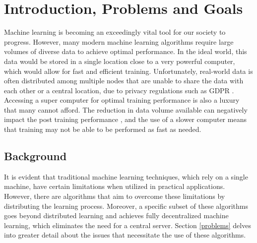 \chapter{Introduction, Problems and Goals}
Machine learning is becoming an exceedingly vital tool for our society to progress. However, many modern machine learning algorithms require large volumes of diverse data to achieve optimal performance. In the ideal world, this data would be stored in a single location close to a very powerful computer, which would allow for fast and efficient training. Unfortunately, real-world data is often distributed among multiple nodes that are unable to share the data with each other or a central location, due to privacy regulations such as GDPR \cite{gdpr}. Accessing a super computer for optimal training performance is also a luxury that many cannot afford. The reduction in data volume available can negatively impact the post training performance \cite{data_volume}, and the use of a slower computer means that training may not be able to be performed as fast as needed.

\section{Background}
It is evident that traditional machine learning techniques, which rely on a single machine, have certain limitations when utilized in practical applications. However, there are algorithms that aim to overcome these limitations by distributing the learning process. Moreover, a specific subset of these algorithms goes beyond distributed learning and achieves fully decentralized machine learning, which eliminates the need for a central server. Section \ref{problems} delves into greater detail about the issues that necessitate the use of these algorithms.

